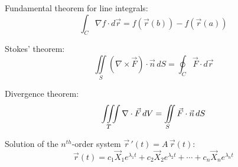 \documentclass[letter, 12pt]{article}
\begin{document}
Fundamental theorem for line integrals:
\[\int_C \nabla f\cdot d\vec{r} = f(\vec{r}(b)) - f(\vec{r}(a))\]

\bigskip

Stokes' theorem:
\[\iint\limits_S(\nabla\times\vec{F})\cdot\vec{n}\,dS = \oint_C \vec{F}\cdot d\vec{r}\]

\bigskip

Divergence theorem:
\[\iiint\limits_T \nabla\cdot\vec{F}\,dV = \int\limits_{\phantom{l}S} \hspace{-.8em} \int
\vec{F}\cdot\vec{n}\,dS\]

\bigskip

Solution of the $n^{th}$-order system $\vec{r}\,'(t) = A\,\vec{r}(t)$:
\[\vec{r}(t) = c_1\vec{X}_1 e^{\lambda_1 t} + c_2\vec{X}_2 e^{\lambda_2 t} + \cdots + c_n\vec{X}_n e^{\lambda_n t}\]

		

\newpage
{}
\end{document}
